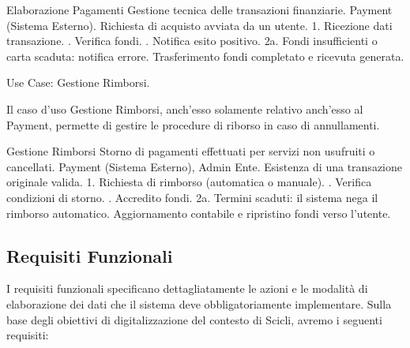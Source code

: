 \vspace{0.5cm}

\usecasetable
{Elaborazione Pagamenti}
{Gestione tecnica delle transazioni finanziarie.}
{Payment (Sistema Esterno).}
{Richiesta di acquisto avviata da un utente.}
{1. Ricezione dati transazione. . Verifica fondi. . Notifica esito positivo.}
{2a. Fondi insufficienti o carta scaduta: notifica errore.}
{Trasferimento fondi completato e ricevuta generata.}
\newpage

\begin{center}
    Use Case: Gestione Rimborsi.
\end{center}
Il caso d'uso Gestione Rimborsi, anch'esso solamente relativo anch'esso al Payment, permette di gestire le procedure di riborso in caso di annullamenti.

\vspace{0.5cm}

\usecasetable
{Gestione Rimborsi}
{Storno di pagamenti effettuati per servizi non usufruiti o cancellati.}
{Payment (Sistema Esterno), Admin Ente.}
{Esistenza di una transazione originale valida.}
{1. Richiesta di rimborso (automatica o manuale). . Verifica condizioni di storno. . Accredito fondi.}
{2a. Termini scaduti: il sistema nega il rimborso automatico.}
{Aggiornamento contabile e ripristino fondi verso l'utente.}
\newpage

\subsection*{Requisiti Funzionali}
I requisiti funzionali specificano dettagliatamente le azioni e le modalità di elaborazione dei dati che il sistema deve obbligatoriamente implementare. Sulla base degli obiettivi di digitalizzazione del contesto di Scicli, avremo i seguenti requisiti: 

